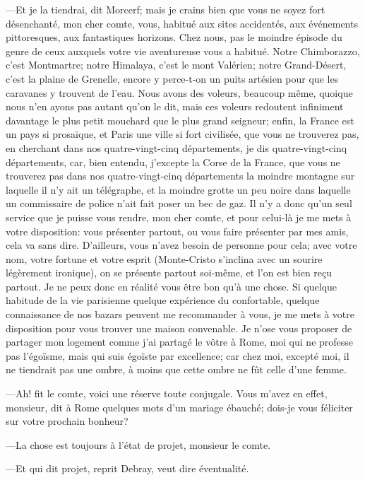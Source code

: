 —Et je la tiendrai, dit Morcerf; mais je crains bien que vous ne soyez fort désenchanté, mon cher comte, vous, habitué aux sites accidentés, aux événements pittoresques, aux fantastiques horizons. Chez nous, pas le moindre épisode du genre de ceux auxquels votre vie aventureuse vous a habitué. Notre Chimborazzo, c'est Montmartre; notre Himalaya, c'est le mont Valérien; notre Grand-Désert, c'est la plaine de Grenelle, encore y perce-t-on un puits artésien pour que les caravanes y trouvent de l'eau. Nous avons des voleurs, beaucoup même, quoique nous n'en ayons pas autant qu'on le dit, mais ces voleurs redoutent infiniment davantage le plus petit mouchard que le plus grand seigneur; enfin, la France est un pays si prosaïque, et Paris une ville si fort civilisée, que vous ne trouverez pas, en cherchant dans nos quatre-vingt-cinq départements, je dis quatre-vingt-cinq départements, car, bien entendu, j'excepte la Corse de la France, que vous ne trouverez pas dans nos quatre-vingt-cinq départements la moindre montagne sur laquelle il n'y ait un télégraphe, et la moindre grotte un peu noire dans laquelle un commissaire de police n'ait fait poser un bec de gaz. Il n'y a donc qu'un seul service que je puisse vous rendre, mon cher comte, et pour celui-là je me mets à votre disposition: vous présenter partout, ou vous faire présenter par mes amis, cela va sans dire. D'ailleurs, vous n'avez besoin de personne pour cela; avec votre nom, votre fortune et votre esprit (Monte-Cristo s'inclina avec un sourire légèrement ironique), on se présente partout soi-même, et l'on est bien reçu partout. Je ne peux donc en réalité vous être bon qu'à une chose. Si quelque habitude de la vie parisienne quelque expérience du confortable, quelque connaissance de nos bazars peuvent me recommander à vous, je me mets à votre disposition pour vous trouver une maison convenable. Je n'ose vous proposer de partager mon logement comme j'ai partagé le vôtre à Rome, moi qui ne professe pas l'égoïsme, mais qui suis égoïste par excellence; car chez moi, excepté moi, il ne tiendrait pas une ombre, à moins que cette ombre ne fût celle d'une femme. 

—Ah! fit le comte, voici une réserve toute conjugale. Vous m'avez en effet, monsieur, dit à Rome quelques mots d'un mariage ébauché; dois-je vous féliciter sur votre prochain bonheur? 

—La chose est toujours à l'état de projet, monsieur le comte. 

—Et qui dit projet, reprit Debray, veut dire éventualité. 

